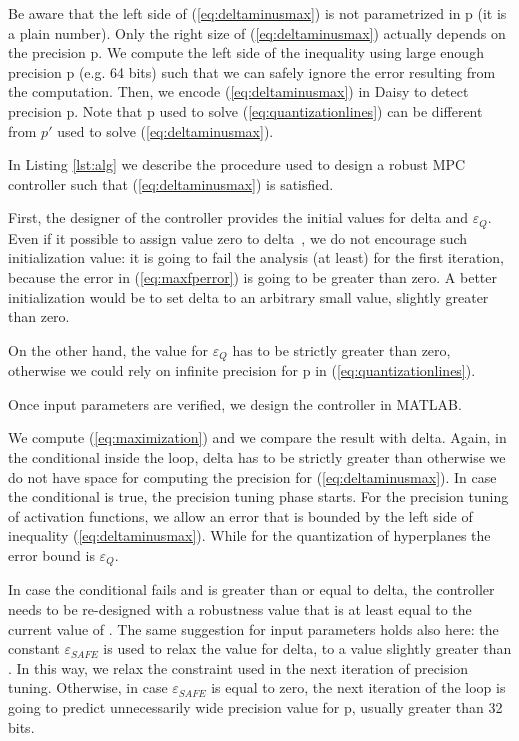 Be aware that the left side of (\ref{eq:deltaminusmax}) is not parametrized in p (it is a plain number). Only the right size of (\ref{eq:deltaminusmax}) actually depends on the precision p. We compute the left side of the inequality using large enough precision p (e.g. 64 bits) such that we can safely ignore the error resulting from the computation.
Then, we encode (\ref{eq:deltaminusmax}) in Daisy to detect precision p. Note that p used to solve (\ref{eq:quantizationlines}) can be different from $p'$ used to solve (\ref{eq:deltaminusmax}).



In Listing \ref{lst:alg} we describe the procedure used to design a robust MPC controller such that (\ref{eq:deltaminusmax}) is satisfied.


First, the designer of the controller provides the initial values for delta and $\varepsilon_{Q}$. Even if it possible to assign value zero to delta~\cite{imperialrmpc}, we do not encourage such initialization value: it is going to fail the analysis (at least) for the first iteration, because the error in (\ref{eq:maxfperror}) is going to be greater than zero. A better initialization would be to set delta to an arbitrary small value, slightly greater than zero.

On the other hand, the value for $\varepsilon_{Q}$ has to be strictly greater than zero, otherwise we could rely on infinite precision for p in (\ref{eq:quantizationlines}).

Once input parameters are verified, we design the controller in MATLAB. 

We compute (\ref{eq:maximization}) and we compare the result with delta. Again, in the conditional inside the loop, delta has to be strictly greater than \maxUij\space otherwise we do not have space for computing the precision for (\ref{eq:deltaminusmax}). In case the conditional is true,
the precision tuning phase starts.
For the precision tuning of activation functions, we allow an error that is bounded by the left side of inequality (\autoref{eq:deltaminusmax}). While for the quantization of hyperplanes the error bound is $\varepsilon_{Q}$.

In case the conditional fails and \maxUij is greater than or equal to delta, the controller needs to be re-designed with a robustness value that is at least equal to the current value of \maxUij. The same suggestion for input parameters holds also here: the constant $\varepsilon_{SAFE}$ is used to relax the value for delta, to a value slightly greater than \maxUij. In this way, we relax the constraint used in the next iteration of precision tuning. Otherwise, in case $\varepsilon_{SAFE}$ is equal to zero, the next iteration of the loop is going to predict unnecessarily wide precision value for p, usually greater than 32 bits. 